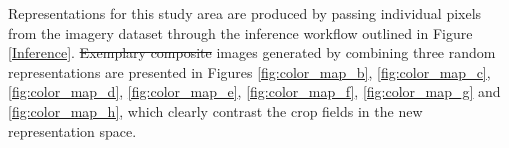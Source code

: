\documentclass[journal,article,submit,pdftex,moreauthors]{Definitions/mdpi}
\providecommand{\DIFadd}[1]{{\protect\color{blue}\uwave{#1}}} %
\providecommand{\DIFdel}[1]{{\protect\color{red}\sout{#1}}}                      %
\providecommand{\DIFaddbegin}{} %
\providecommand{\DIFaddend}{} %
\providecommand{\DIFdelbegin}{} %
\providecommand{\DIFdelend}{} %
\begin{document}
Representations for this study area are produced by passing individual pixels from the imagery dataset through the inference workflow outlined in Figure \ref{Inference}. \DIFdelbegin \DIFdel{Exemplary composite }\DIFdelend \DIFaddbegin \DIFadd{Composite }\DIFaddend images generated by combining three random representations are presented in Figures \ref{fig:color_map_b}, \ref{fig:color_map_c}, \ref{fig:color_map_d}, \ref{fig:color_map_e}, \ref{fig:color_map_f}, \ref{fig:color_map_g} and \ref{fig:color_map_h}, which clearly contrast the crop fields in the new representation space.
\end{document}
